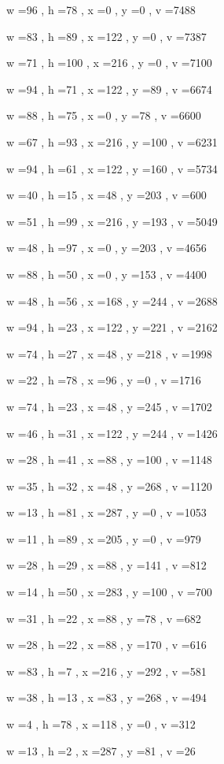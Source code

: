 \documentclass[11pt]{article}
\begin{document}
w =96 , h =78 , x =0 , y =0 , v =7488
\par
w =83 , h =89 , x =122 , y =0 , v =7387
\par
w =71 , h =100 , x =216 , y =0 , v =7100
\par
w =94 , h =71 , x =122 , y =89 , v =6674
\par
w =88 , h =75 , x =0 , y =78 , v =6600
\par
w =67 , h =93 , x =216 , y =100 , v =6231
\par
w =94 , h =61 , x =122 , y =160 , v =5734
\par
w =40 , h =15 , x =48 , y =203 , v =600
\par
w =51 , h =99 , x =216 , y =193 , v =5049
\par
w =48 , h =97 , x =0 , y =203 , v =4656
\par
w =88 , h =50 , x =0 , y =153 , v =4400
\par
w =48 , h =56 , x =168 , y =244 , v =2688
\par
w =94 , h =23 , x =122 , y =221 , v =2162
\par
w =74 , h =27 , x =48 , y =218 , v =1998
\par
w =22 , h =78 , x =96 , y =0 , v =1716
\par
w =74 , h =23 , x =48 , y =245 , v =1702
\par
w =46 , h =31 , x =122 , y =244 , v =1426
\par
w =28 , h =41 , x =88 , y =100 , v =1148
\par
w =35 , h =32 , x =48 , y =268 , v =1120
\par
w =13 , h =81 , x =287 , y =0 , v =1053
\par
w =11 , h =89 , x =205 , y =0 , v =979
\par
w =28 , h =29 , x =88 , y =141 , v =812
\par
w =14 , h =50 , x =283 , y =100 , v =700
\par
w =31 , h =22 , x =88 , y =78 , v =682
\par
w =28 , h =22 , x =88 , y =170 , v =616
\par
w =83 , h =7 , x =216 , y =292 , v =581
\par
w =38 , h =13 , x =83 , y =268 , v =494
\par
w =4 , h =78 , x =118 , y =0 , v =312
\par
w =13 , h =2 , x =287 , y =81 , v =26
\par
\newpage
\end{document}
